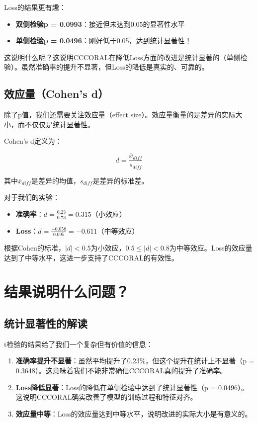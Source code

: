 \documentclass[12pt,a4paper]{ctexart}
\begin{document}
Loss的结果更有趣：
\begin{itemize}
    \item \textbf{双侧检验p = 0.0993}：接近但未达到0.05的显著性水平
    \item \textbf{单侧检验p = 0.0496}：刚好低于0.05，达到统计显著性！
\end{itemize}

这说明什么呢？这说明CCCORAL在降低Loss方面的改进是统计显著的（单侧检验）。虽然准确率的提升不显著，但Loss的降低是真实的、可靠的。

\subsection{效应量（Cohen's d）}

除了p值，我们还需要关注效应量（effect size）。效应量衡量的是差异的实际大小，而不仅仅是统计显著性。

Cohen's d定义为：

\begin{equation}
d = \frac{\bar{x}_{diff}}{s_{diff}}
\end{equation}

其中$\bar{x}_{diff}$是差异的均值，$s_{diff}$是差异的标准差。

对于我们的实验：
\begin{itemize}
    \item \textbf{准确率}：$d = \frac{0.23}{0.73} = 0.315$（小效应）
    \item \textbf{Loss}：$d = \frac{-0.058}{0.095} = -0.611$（中等效应）
\end{itemize}

根据Cohen的标准，$|d| < 0.5$为小效应，$0.5 \leq |d| < 0.8$为中等效应。Loss的效应量达到了中等水平，这进一步支持了CCCORAL的有效性。

\section{结果说明什么问题？}

\subsection{统计显著性的解读}

t检验的结果给了我们一个复杂但有价值的信息：

\begin{enumerate}
    \item \textbf{准确率提升不显著}：虽然平均提升了0.23\%，但这个提升在统计上不显著（p = 0.3648）。这意味着我们不能非常确信CCCORAL真的提升了准确率。
    
    \item \textbf{Loss降低显著}：Loss的降低在单侧检验中达到了统计显著性（p = 0.0496）。这说明CCCORAL确实改善了模型的训练过程和特征对齐。
    
    \item \textbf{效应量中等}：Loss的效应量达到中等水平，说明改进的实际大小是有意义的。
\end{enumerate}
\end{document}
